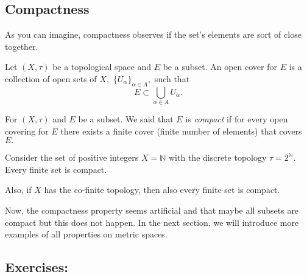 \documentclass[
	fontsize=10pt, %
	twoside=false, %
	secnumdepth=1, %
]{kaobook}
\begin{document}
\subsection{Compactness}

As you can imagine, compactness observes if the set's elements are sort of close together.  


\begin{definition}
Let $(X,\tau)$ be a topological space and $E$ be a subset. An open cover for $E$ is a collection of open sets of $X,$ $\{U_\alpha\}_{\alpha\in A},$ such that $$E\subset \bigcup_{\alpha\in A} U_\alpha.$$
\end{definition}

\begin{definition}
For $(X,\tau)$ and $E$ be a subset. We said that $E$ is \emph{compact} if for every open covering for $E$ there exists a finite cover (finite number of elements) that covers $E.$
\end{definition}

\begin{example}
Consider the set of positive integers $X=\mathbb{N}$ with the discrete topology $\tau=2^{\mathbb{N}}.$ Every finite set is compact. 

Also, if $X$ has the co-finite topology, then also every finite set is compact.
\end{example}

Now, the compactness property seems artificial and that maybe all subsets are compact but this does not happen. In the next section, we will introduce more examples of all properties on metric spaces.

\subsection{Exercises:}
\end{document}
